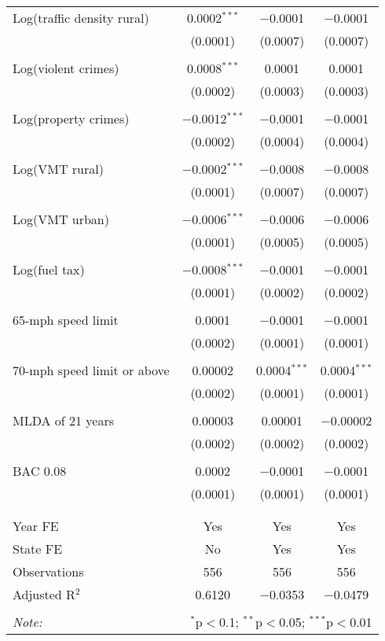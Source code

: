 \begin{table}[!htbp]
\begin{tabular}{@{\extracolsep{5pt}}lccc}
 Log(traffic density rural) & 0.0002$^{***}$ & $-$0.0001 & $-$0.0001 \\ 
  & (0.0001) & (0.0007) & (0.0007) \\ 
  & & & \\ 
 Log(violent crimes) & 0.0008$^{***}$ & 0.0001 & 0.0001 \\ 
  & (0.0002) & (0.0003) & (0.0003) \\ 
  & & & \\ 
 Log(property crimes) & $-$0.0012$^{***}$ & $-$0.0001 & $-$0.0001 \\ 
  & (0.0002) & (0.0004) & (0.0004) \\ 
  & & & \\ 
 Log(VMT rural) & $-$0.0002$^{***}$ & $-$0.0008 & $-$0.0008 \\ 
  & (0.0001) & (0.0007) & (0.0007) \\ 
  & & & \\ 
 Log(VMT urban) & $-$0.0006$^{***}$ & $-$0.0006 & $-$0.0006 \\ 
  & (0.0001) & (0.0005) & (0.0005) \\ 
  & & & \\ 
 Log(fuel tax) & $-$0.0008$^{***}$ & $-$0.0001 & $-$0.0001 \\ 
  & (0.0001) & (0.0002) & (0.0002) \\ 
  & & & \\ 
 65-mph speed limit & 0.0001 & $-$0.0001 & $-$0.0001 \\ 
  & (0.0002) & (0.0001) & (0.0001) \\ 
  & & & \\ 
 70-mph speed limit or above & 0.00002 & 0.0004$^{***}$ & 0.0004$^{***}$ \\ 
  & (0.0002) & (0.0001) & (0.0001) \\ 
  & & & \\ 
 MLDA of 21 years & 0.00003 & 0.00001 & $-$0.00002 \\ 
  & (0.0002) & (0.0002) & (0.0002) \\ 
  & & & \\ 
 BAC 0.08 & 0.0002 & $-$0.0001 & $-$0.0001 \\ 
  & (0.0001) & (0.0001) & (0.0001) \\ 
  & & & \\ 
\hline \\[-1.8ex] 
Year FE & Yes & Yes & Yes \\ 
State FE & No & Yes & Yes \\ 
Observations & 556 & 556 & 556 \\ 
Adjusted R$^{2}$ & 0.6120 & $-$0.0353 & $-$0.0479 \\ 
\hline 
\hline \\[-1.8ex] 
\textit{Note:}  & \multicolumn{3}{r}{$^{*}$p$<$0.1; $^{**}$p$<$0.05; $^{***}$p$<$0.01} \\ 
\end{tabular} 
\end{table} 
